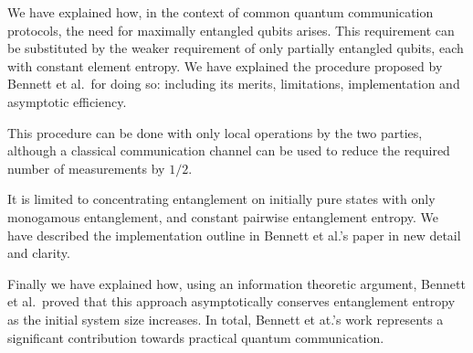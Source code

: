 We have explained how, in the context of common quantum communication protocols, the need for maximally entangled qubits arises.
This requirement can be substituted by the weaker requirement of only partially entangled qubits, each with constant element entropy.
We have explained the procedure proposed by Bennett et al.\ for doing so: including its merits, limitations, implementation and asymptotic efficiency. 

This procedure can be done with only local operations by the two parties, although a classical communication channel can be used to reduce the required number of measurements by $1/2$.

It is limited to concentrating entanglement on initially pure states with only monogamous entanglement, and constant pairwise entanglement entropy.
We have described the implementation outline in Bennett et al.'s paper in new detail and clarity.

Finally we have explained how, using an information theoretic argument, Bennett et al.\ proved that this approach asymptotically conserves entanglement entropy as the initial system size increases.
In total, Bennett et at.'s work represents a significant contribution towards practical quantum communication.